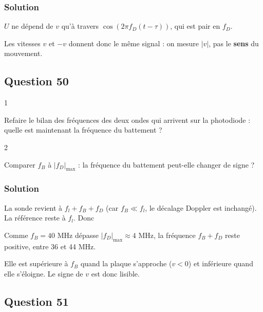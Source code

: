 \documentclass[11pt,a4paper]{article}
\newcommand{\equationajustee}[1]{%
  \sbox{\boiteequation}{$\displaystyle #1$}%
  \ifdim\wd\boiteequation>\linewidth
    \[\resizebox{\linewidth}{!}{\usebox{\boiteequation}}\]%
  \else
    \[#1\]%
  \fi}
\begin{document}
\hypertarget{solution-48}{%
\subsubsection{Solution}\label{solution-48}}

\(U\) ne dépend de \(v\) qu'à travers \(\cos(2\pi f_D(t-\tau))\), qui est pair en \(f_D\).

Les vitesses \(v\) et \(-v\) donnent donc le même signal : on mesure \(|v|\), pas le \textbf{sens} du mouvement.

\hypertarget{question-50}{%
\subsection{Question 50}\label{question-50}}

\begin{indication}{1}

Refaire le bilan des fréquences des deux ondes qui arrivent sur la photodiode : quelle est maintenant la fréquence du battement ?

\end{indication}

\begin{indication}{2}

Comparer \(f_B\) à \(|f_D|_{\max}\) : la fréquence du battement peut-elle changer de signe ?

\end{indication}

\hypertarget{solution-49}{%
\subsubsection{Solution}\label{solution-49}}

La sonde revient à \(f_l+f_B+f_D\) (car \(f_B\ll f_l\), le décalage Doppler est inchangé). La référence reste à \(f_l\). Donc

\equationajustee{\boxed{U(t)=U_0\Big(1+\cos\big[2\pi(f_B+f_D(t))t+\psi_0\big]\Big)}}

Comme \(f_B=40\) MHz dépasse \(|f_D|_{\max}\approx4\) MHz, la fréquence \(f_B+f_D\) reste positive, entre 36 et 44 MHz.

Elle est supérieure à \(f_B\) quand la plaque s'approche (\(v<0\)) et inférieure quand elle s'éloigne. Le signe de \(v\) est donc lisible.

\hypertarget{question-51}{%
\subsection{Question 51}\label{question-51}}
\end{document}
